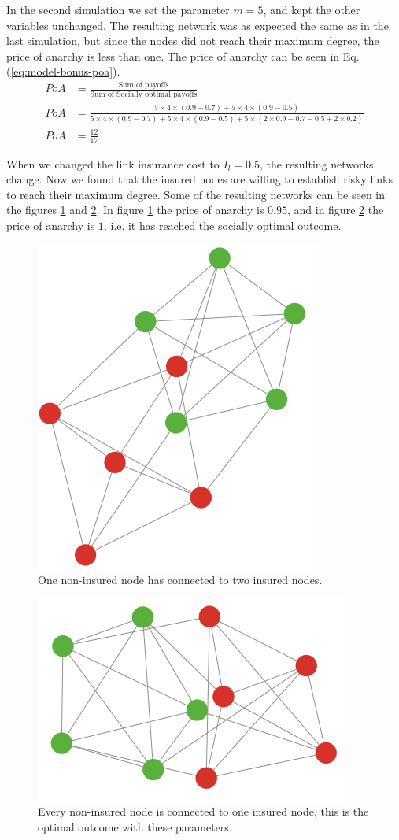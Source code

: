 In the second simulation we set the parameter $m=5$, and kept the other variables unchanged. The resulting network was as expected the same as in the last simulation, but since the nodes did not reach their maximum degree, the price of anarchy is less than one. The price of anarchy can be seen in Eq.(\ref{eq:model-bonus-poa}).
\begin{eqnarray}
PoA&=\frac{\text{Sum of payoffs}}{\text{Sum of Socially optimal payoffs}}  \nonumber \\
PoA&=\frac{5\times 4\times (0.9-0.7)+5\times 4\times(0.9-0.5)}{5\times 4\times (0.9-0.7)+5\times 4\times(0.9-0.5)+5\times (2\times 0.9-0.7-0.5 + 2 \times 0.2)}\nonumber \\
PoA&=\frac{12}{17}
\label{eq:model-bonus-poa}
\end{eqnarray}

When we changed the link insurance cost to $I_{l}=0.5$, the resulting networks change. Now we found that the insured nodes are willing to establish risky links to reach their maximum degree. Some of the resulting networks can be seen in the figures \ref{fig:bonusvolating:a} and \ref{fig:bonusvolating:b}. In figure \ref{fig:bonusvolating:a} the price of anarchy is $0.95$, and in figure \ref{fig:bonusvolating:b} the price of anarchy is $1$, i.e. it has reached the socially optimal outcome.

\begin{figure}
  \centering
  \includegraphics[width=0.55\linewidth]{../Figures/BonusGameViolating.png}
  \caption{\label{fig:bonusvolating:a} One non-insured node has connected to two insured nodes.}
\end{figure}
\quad
\begin{figure}
  \centering
  \includegraphics[width=0.55\linewidth]{../Figures/BonusGameViolatingOptimal.png}
  \caption{\label{fig:bonusvolating:b}Every non-insured node is connected to one insured node, this is the optimal outcome with these parameters.}
\end{figure}
  

